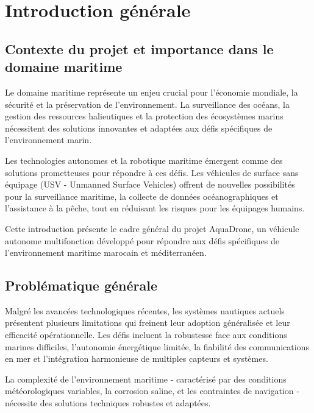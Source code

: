 \chapter[Introduction générale]{Introduction générale}
\label{cp:introduction-generale}

{
\parindent0pt

\section{Contexte du projet et importance dans le domaine maritime}
Le domaine maritime représente un enjeu crucial pour l'économie mondiale, la sécurité et la préservation de l'environnement. La surveillance des océans, la gestion des ressources halieutiques et la protection des écosystèmes marins nécessitent des solutions innovantes et adaptées aux défis spécifiques de l'environnement marin.

Les technologies autonomes et la robotique maritime émergent comme des solutions prometteuses pour répondre à ces défis. Les véhicules de surface sans équipage (USV - Unmanned Surface Vehicles) offrent de nouvelles possibilités pour la surveillance maritime, la collecte de données océanographiques et l'assistance à la pêche, tout en réduisant les risques pour les équipages humains.

\begin{block}[note]
Cette introduction présente le cadre général du projet AquaDrone, un véhicule autonome multifonction développé pour répondre aux défis spécifiques de l'environnement maritime marocain et méditerranéen.
\end{block}

\section{Problématique générale}
Malgré les avancées technologiques récentes, les systèmes nautiques actuels présentent plusieurs limitations qui freinent leur adoption généralisée et leur efficacité opérationnelle. Les défis incluent la robustesse face aux conditions marines difficiles, l'autonomie énergétique limitée, la fiabilité des communications en mer et l'intégration harmonieuse de multiples capteurs et systèmes.

La complexité de l'environnement maritime - caractérisé par des conditions météorologiques variables, la corrosion saline, et les contraintes de navigation - nécessite des solutions techniques robustes et adaptées.

}
